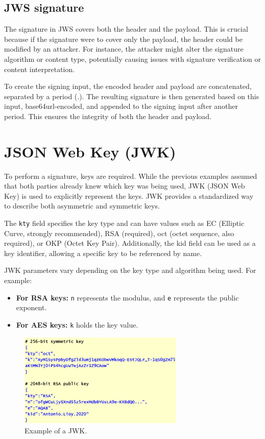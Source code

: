 \subsection{JWS signature}
The signature in JWS covers both the header and the payload. This is
crucial because if the signature were to cover only the payload, the
header could be modified by an attacker. For instance, the attacker
might alter the signature algorithm or content type, potentially
causing issues with signature verification or content interpretation.

To create the signing input, the encoded header and payload are
concatenated, separated by a period (.). The resulting signature is
then generated based on this input, base64url-encoded, and appended to
the signing input after another period. This ensures the integrity of
both the header and payload.

\section{JSON Web Key (JWK)}

To perform a signature, keys are required. While the previous examples assumed that both parties already knew which key was being used, JWK (JSON Web Key) is used to explicitly represent the keys. JWK provides a standardized way to describe both asymmetric and symmetric keys.

The \texttt{kty} field specifies the key type and can have values such
as EC (Elliptic Curve, strongly recommended), RSA (required), oct
(octet sequence, also required), or OKP (Octet Key Pair).
Additionally, the kid field can be used as a key identifier, allowing
a specific key to be referenced by name.

JWK parameters vary depending on the key type and algorithm being
used. For example:
\begin{itemize}
    \item \textbf{For RSA keys:} \texttt{n} represents the modulus,
      and \texttt{e} represents the public exponent.
    \item \textbf{For AES keys:} \texttt{k} holds the key value.
\end{itemize}

\begin{figure}[H]
  \centering
  \includegraphics[width=0.7\textwidth]{img/jwk ex.png}
  \caption{Example of a JWK.}
  \label{fig:jwk ex}
\end{figure}

